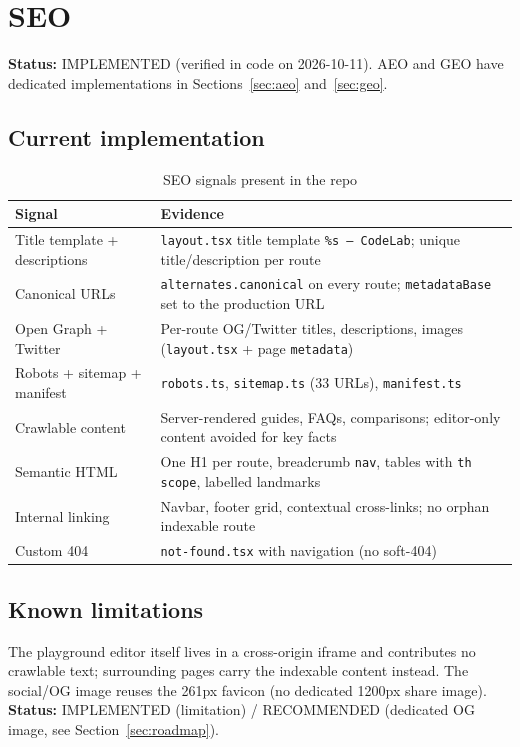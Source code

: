 \section{SEO}
\label{sec:seo}

\textbf{Status:} IMPLEMENTED (verified in code on 2026-10-11). AEO and GEO have dedicated implementations in Sections~\ref{sec:aeo} and~\ref{sec:geo}.

\subsection{Current implementation}
\begin{table}[H]
\centering
\caption{SEO signals present in the repo}
\begin{tabular}{|l|p{8.5cm}|}
\hline
\textbf{Signal} & \textbf{Evidence} \\ \hline
Title template + descriptions & \texttt{layout.tsx} title template \texttt{\%s --- CodeLab}; unique title/description per route \\ \hline
Canonical URLs & \texttt{alternates.canonical} on every route; \texttt{metadataBase} set to the production URL \\ \hline
Open Graph + Twitter & Per-route OG/Twitter titles, descriptions, images (\texttt{layout.tsx} + page \texttt{metadata}) \\ \hline
Robots + sitemap + manifest & \texttt{robots.ts}, \texttt{sitemap.ts} (33 URLs), \texttt{manifest.ts} \\ \hline
Crawlable content & Server-rendered guides, FAQs, comparisons; editor-only content avoided for key facts \\ \hline
Semantic HTML & One H1 per route, breadcrumb \texttt{nav}, tables with \texttt{th scope}, labelled landmarks \\ \hline
Internal linking & Navbar, footer grid, contextual cross-links; no orphan indexable route \\ \hline
Custom 404 & \texttt{not-found.tsx} with navigation (no soft-404) \\ \hline
\end{tabular}
\end{table}

\subsection{Known limitations}
The playground editor itself lives in a cross-origin iframe and contributes no crawlable text; surrounding pages carry the indexable content instead. The social/OG image reuses the 261px favicon (no dedicated 1200px share image). \textbf{Status:} IMPLEMENTED (limitation) / RECOMMENDED (dedicated OG image, see Section~\ref{sec:roadmap}).
